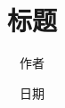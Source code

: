 \documentclass{ctexbook}
\begin{document}
\frontmatter
\title{标题} 
\author{作者}
\date{日期}
\maketitle
\tableofcontents
\mainmatter



\appendix %

\backmatter %
\end{document}

